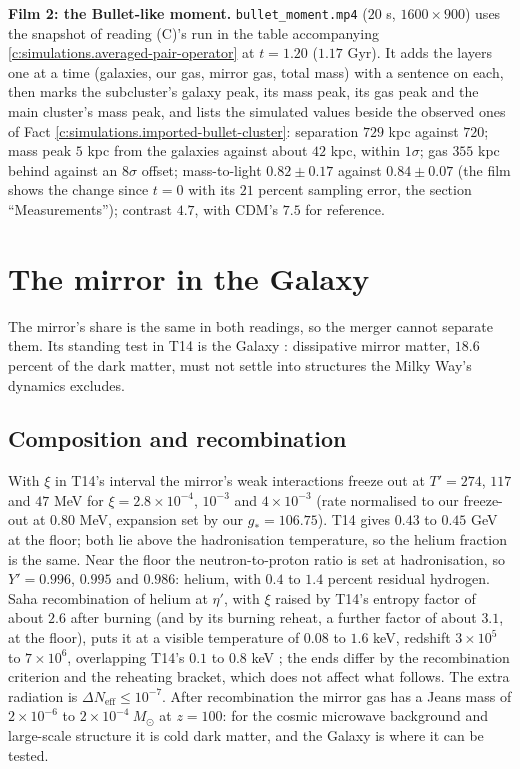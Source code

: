 \documentclass[11pt]{article}
\theoremstyle{definition}
\theoremstyle{plain}
\providecommand{\Msun}{}\renewcommand{\Msun}{M_{\odot}}
\providecommand{\file}{}\renewcommand{\file}[1]{\texttt{#1}}
\begin{document}
\label{c:note.simulations.setting-films-3}
\textbf{Film 2: the Bullet-like moment.} \file{bullet\_moment.mp4} ($20$ s, $1600 \times 900$) uses the snapshot of reading (C)'s run in the table accompanying \ref{c:simulations.averaged-pair-operator} at $t = 1.20$ ($1.17$ Gyr). It adds the layers one at a time (galaxies, our gas, mirror gas, total mass) with a sentence on each, then marks the subcluster's galaxy peak, its mass peak, its gas peak and the main cluster's mass peak, and lists the simulated values beside the observed ones of Fact \ref{c:simulations.imported-bullet-cluster}: separation $729$ kpc against $720$; mass peak $5$ kpc from the galaxies against about $42$ kpc, within $1\sigma$; gas $355$ kpc behind against an $8\sigma$ offset; mass-to-light $0.82 \pm 0.17$ against $0.84 \pm 0.07$ (the film shows the change since $t = 0$ with its $21$ percent sampling error, the section ``Measurements''); contrast $4.7$, with CDM's $7.5$ for reference.

\section{The mirror in the Galaxy}

\label{c:note.simulations.setting-mirror-galaxy}
The mirror's share is the same in both readings, so the merger cannot separate them. Its standing test in T14 is the Galaxy \cite[\S 8, refutation item 6]{ButlerT14}: dissipative mirror matter, $18.6$ percent of the dark matter, must not settle into structures the Milky Way's dynamics excludes.

\subsection*{Composition and recombination}
\label{c:note.simulations.setting-composition-recombination}
With $\xi$ in T14's interval the mirror's weak interactions freeze out at $T' = 274$, $117$ and $47$ MeV for $\xi = 2.8 \times 10^{-4}$, $10^{-3}$ and $4 \times 10^{-3}$ (rate normalised to our freeze-out at $0.80$ MeV, expansion set by our $g_{*} = 106.75$). T14 gives $0.43$ to $0.45$ GeV at the floor; both lie above the hadronisation temperature, so the helium fraction is the same. Near the floor the neutron-to-proton ratio is set at hadronisation, so $Y' = 0.996$, $0.995$ and $0.986$: helium, with $0.4$ to $1.4$ percent residual hydrogen. Saha recombination of helium at $\eta'$, with $\xi$ raised by T14's entropy factor of about $2.6$ after burning (and by its burning reheat, a further factor of about $3.1$, at the floor), puts it at a visible temperature of $0.08$ to $1.6$ keV, redshift $3 \times 10^{5}$ to $7 \times 10^{6}$, overlapping T14's $0.1$ to $0.8$ keV \cite[Prop.~4.6]{ButlerT14}; the ends differ by the recombination criterion and the reheating bracket, which does not affect what follows. The extra radiation is $\Delta N_{\mathrm{eff}} \le 10^{-7}$. After recombination the mirror gas has a Jeans mass of $2 \times 10^{-6}$ to $2 \times 10^{-4}\ \Msun$ at $z = 100$: for the cosmic microwave background and large-scale structure it is cold dark matter, and the Galaxy is where it can be tested.
\end{document}
